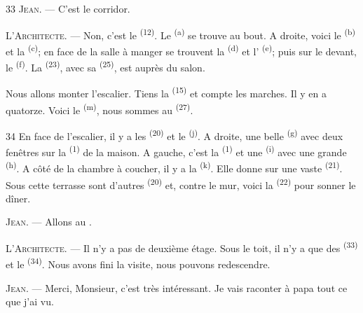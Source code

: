 \begin{VUpage}[35]{33}
\VUblancAlinea
\textsc{Jean}. --- C'est le corridor.

\VUblancAlinea
\textsc{L'Architecte}. --- Non, c'est le  \textsuperscript{(12)}. Le\nl
{} \textsuperscript{(a)} se trouve au bout. A droite, voici le\nl
{} \textsuperscript{(b)} et la  \textsuperscript{(c)}; en face de la\nl
salle à manger se trouvent la  \textsuperscript{(d)} et l' \textsuperscript{(e)};\nl
puis sur le devant, le  \textsuperscript{(f)}. La\nl
{} \textsuperscript{(23)}, avec sa  \textsuperscript{(25)}, est auprès du\nl
salon.

\VUblancAlinea
Nous allons monter l'escalier. Tiens la  \textsuperscript{(15)}\nl
et compte les marches. Il y en a quatorze. Voici le\nl
{} \textsuperscript{(m)}, nous sommes au  \textsuperscript{(27)}.
\end{VUpage}

\begin{VUpage}[36]{34}
\VUblancAlinea
En face de l'escalier, il y a les \cc
{} \textsuperscript{(20)} et le  \textsuperscript{(j)}. A droite,\nl
une belle  \textsuperscript{(g)} avec deux fenêtres\nl
sur la  \textsuperscript{(1)} de la maison. A gauche, c'est la \nl
{} \textsuperscript{(1)} et une  \textsuperscript{(i)} avec une\nl
grande  \textsuperscript{(h)}. A côté de la chambre à coucher, il\nl
y a la  \textsuperscript{(k)}. Elle donne sur\nl
une vaste  \textsuperscript{(21)}. Sous cette terrasse sont\nl
d'autres  \textsuperscript{(20)} et, contre le mur,\nl
voici la  \textsuperscript{(22)} pour sonner le dîner.

\VUblancAlinea
\textsc{Jean}. --- Allons au .

\VUblancAlinea
\textsc{L'Architecte}. --- Il n'y a pas de deuxième étage.\nl
Sous le toit, il n'y a que des  \textsuperscript{(33)} et le\nl
{} \textsuperscript{(34)}. Nous avons fini la visite, nous pouvons\nl
redescendre.

\VUblancAlinea
\textsc{Jean}. --- Merci, Monsieur, c'est très intéressant.\nl
Je vais raconter à papa tout ce que j'ai vu.

\VUsaut{4.0mm}
\VUfilet{22mm}
\end{VUpage}

